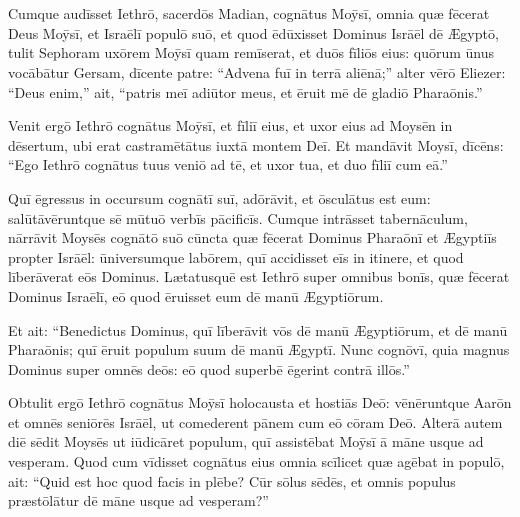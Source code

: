 \chapter{}


\thispagestyle{empty}


Cumque audīsset Iethrō, sacerdōs Madian, cognātus Moȳsī,
omnia quæ fēcerat Deus Moȳsī, et Israēlī populō suō, et
quod ēdūxisset Dominus Isrāēl dē Ægyptō, 
tulit Sephoram
uxōrem Moȳsī quam remīserat, 
et duōs fīliōs eius: quōrum ūnus vocābātur
Gersam, dīcente patre: ``Advena fuī in terrā aliēnā;'' 
alter vērō Eliezer:
``Deus enim,'' ait, ``patris meī adiūtor
meus, et ēruit mē dē gladiō Pharaōnis.'' 

Venit ergō Iethrō
cognātus Moȳsī, et fīliī eius, et uxor eius ad Moysēn in
dēsertum, ubi erat castramētātus iuxtā
montem Deī. 
Et mandāvit Moysī, dīcēns: ``Ego Iethrō cognātus tuus veniō
ad tē, et uxor tua, et duo fīliī cum eā.'' 

Quī ēgressus in occursum
cognātī suī, adōrāvit, et ōsculātus est eum:
salūtāvēruntque sē mūtuō verbīs pācificīs. Cumque intrāsset
tabernāculum, 
nārrāvit Moysēs
cognātō suō cūncta quæ fēcerat Dominus
Pharaōnī et Ægyptiīs propter Isrāēl: ūniversumque labōrem,
quī accidisset eīs in itinere, et quod līberāverat eōs Dominus.
Lætatusquē est Iethrō super omnibus bonīs, quæ fēcerat Dominus Israēlī, eō
quod ēruisset eum dē manū Ægyptiōrum. 

Et ait: ``Benedictus Dominus, quī līberāvit vōs dē manū Ægyptiōrum, et dē manū
Pharaōnis; quī ēruit populum suum dē manū Ægyptī. 
Nunc cognōvī, quia
magnus Dominus super omnēs deōs: eō quod superbē ēgerint contrā illōs.''

Obtulit ergō Iethrō cognātus Moȳsī holocausta et hostiās Deō: vēnēruntque Aarōn et omnēs seniōrēs
Isrāēl, ut comederent pānem cum eō cōram
Deō. 
Alterā autem diē sēdit Moysēs ut iūdicāret populum, quī assistēbat Moȳsī ā māne usque
ad vesperam. 
Quod cum vīdisset cognātus
eius omnia scīlicet quæ agēbat in populō, ait: ``Quid est hoc quod facis in
plēbe? Cūr sōlus sēdēs, et omnis populus
præstōlātur dē māne usque ad vesperam?''

